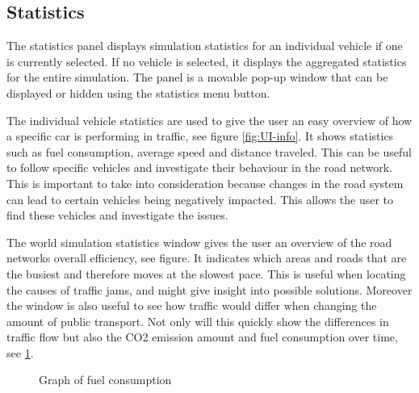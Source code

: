         
    \subsection{Statistics}
        The statistics panel displays simulation statistics for an individual vehicle if one is currently selected. If no vehicle is selected, it displays the aggregated statistics for the entire simulation. The panel is a movable pop-up window that can be displayed or hidden using the statistics menu button.

        The individual vehicle statistics are used to give the user an easy overview of how a specific car is performing in traffic, see figure \ref{fig:UI-info}. It shows statistics such as fuel consumption, average speed and distance traveled. This can be useful to follow specific vehicles and investigate their behaviour in the road network. This is important to take into consideration because changes in the road system can lead to certain vehicles being negatively impacted. This allows the user to find these vehicles and investigate the issues.


        The world simulation statistics window gives the user an overview of the road networks overall efficiency, see figure. It indicates which areas and roads that are the busiest and therefore moves at the slowest pace. This is useful when locating the causes of traffic jams, and might give insight into possible solutions. Moreover the window is also useful to see how traffic would differ when changing the amount of public transport. Not only will this quickly show the differences in traffic flow but also the CO2 emission amount and fuel consumption over time, see \ref{fig:Emissions}.
    
    \begin{figure}[ht]
        \centering
        \caption{Graph of fuel consumption}
        \label{fig:Emissions}
    \end{figure}


